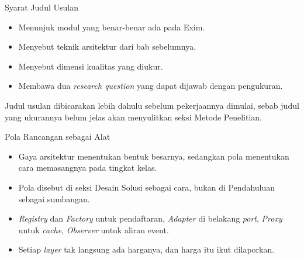 \documentclass[aspectratio=169, table, 12pt]{beamer}
\begin{document}
\begin{frame}{{\Large Syarat Judul Usulan}}
  \vspace{10pt}
  \begin{itemize}\small
    \item Menunjuk modul yang benar-benar ada pada Exim.
    \item Menyebut teknik arsitektur dari bab sebelumnya.
    \item Menyebut dimensi kualitas yang diukur.
    \item Membawa dua \textit{research question} yang dapat dijawab dengan
          pengukuran.
  \end{itemize}

  \vspace{8pt}
  {\small Judul usulan dibicarakan lebih dahulu sebelum pekerjaannya dimulai,
  sebab judul yang ukurannya belum jelas akan menyulitkan seksi Metode
  Penelitian.}
\end{frame}

\begin{frame}{{\Large Pola Rancangan sebagai Alat}}
  \vspace{10pt}
  \begin{itemize}\small
    \item Gaya arsitektur menentukan bentuk besarnya, sedangkan pola
          menentukan cara memasangnya pada tingkat kelas.
    \item Pola disebut di seksi Desain Solusi sebagai cara, bukan di
          Pendahuluan sebagai sumbangan.
    \item \textit{Registry} dan \textit{Factory} untuk pendaftaran,
          \textit{Adapter} di belakang \textit{port}, \textit{Proxy} untuk
          \textit{cache}, \textit{Observer} untuk aliran event.
    \item Setiap \textit{layer} tak langsung ada harganya, dan harga itu ikut
          dilaporkan.
  \end{itemize}
\end{frame}
\end{document}
